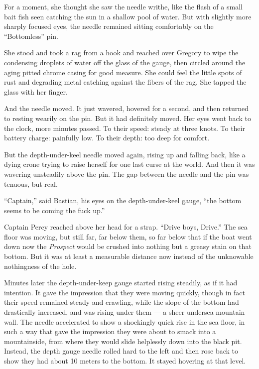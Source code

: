 \documentclass[
]{scrbook}
\begin{document}
For a moment, she thought she saw the needle writhe, like the flash of a
small bait fish seen catching the sun in a shallow pool of water. But
with slightly more sharply focused eyes, the needle remained sitting
comfortably on the ``Bottomless'' pin.

She stood and took a rag from a hook and reached over Gregory to wipe
the condensing droplets of water off the glass of the gauge, then
circled around the aging pitted chrome casing for good measure. She
could feel the little spots of rust and degrading metal catching against
the fibers of the rag. She tapped the glass with her finger.

And the needle moved. It just wavered, hovered for a second, and then
returned to resting wearily on the pin. But it had definitely moved. Her
eyes went back to the clock, more minutes passed. To their speed: steady
at three knots. To their battery charge: painfully low. To their depth:
too deep for comfort.

But the depth-under-keel needle moved again, rising up and falling back,
like a dying crone trying to raise herself for one last curse at the
world. And then it was wavering unsteadily above the pin. The gap
between the needle and the pin was tenuous, but real.

``Captain,'' said Bastian, his eyes on the depth-under-keel gauge, ``the
bottom seems to be coming the fuck up.''

Captain Percy reached above her head for a strap. ``Drive boys, Drive.''
The sea floor was moving, but still far, far below them, so far below
that if the boat went down now the \emph{Prospect} would be crushed into
nothing but a greasy stain on that bottom. But it was at least a
measurable distance now instead of the unknowable nothingness of the
hole.

Minutes later the depth-under-keep gauge started rising steadily, as if
it had intention. It gave the impression that they were moving quickly,
though in fact their speed remained steady and crawling, while the slope
of the bottom had drastically increased, and was rising under them --- a
sheer undersea mountain wall. The needle accelerated to show a
shockingly quick rise in the sea floor, in such a way that gave the
impression they were about to smack into a mountainside, from where they
would slide helplessly down into the black pit. Instead, the depth gauge
needle rolled hard to the left and then rose back to show they had about
10 meters to the bottom. It stayed hovering at that level.
\end{document}
